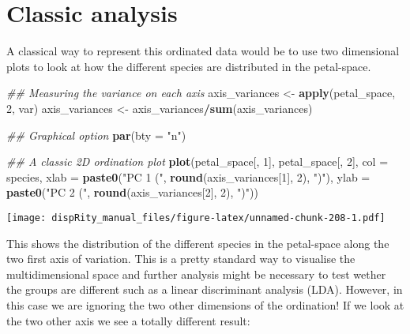 \documentclass[
]{book}
\newenvironment{Shaded}{\begin{snugshade}}{\end{snugshade}}
\newcommand{\CommentTok}[1]{\textcolor[rgb]{0.56,0.35,0.01}{\textit{#1}}}
\newcommand{\DataTypeTok}[1]{\textcolor[rgb]{0.13,0.29,0.53}{#1}}
\newcommand{\DecValTok}[1]{\textcolor[rgb]{0.00,0.00,0.81}{#1}}
\newcommand{\KeywordTok}[1]{\textcolor[rgb]{0.13,0.29,0.53}{\textbf{#1}}}
\newcommand{\NormalTok}[1]{#1}
\newcommand{\OperatorTok}[1]{\textcolor[rgb]{0.81,0.36,0.00}{\textbf{#1}}}
\newcommand{\StringTok}[1]{\textcolor[rgb]{0.31,0.60,0.02}{#1}}
\begin{document}
\hypertarget{classic-analysis}{%
\section{Classic analysis}\label{classic-analysis}}

A classical way to represent this ordinated data would be to use two dimensional plots to look at how the different species are distributed in the petal-space.

\begin{Shaded}
\begin{Highlighting}[]
\CommentTok{\#\# Measuring the variance on each axis}
\NormalTok{axis\_variances \textless{}{-}}\StringTok{ }\KeywordTok{apply}\NormalTok{(petal\_space, }\DecValTok{2}\NormalTok{, var)}
\NormalTok{axis\_variances \textless{}{-}}\StringTok{ }\NormalTok{axis\_variances}\OperatorTok{/}\KeywordTok{sum}\NormalTok{(axis\_variances)}

\CommentTok{\#\# Graphical option}
\KeywordTok{par}\NormalTok{(}\DataTypeTok{bty =} \StringTok{"n"}\NormalTok{)}

\CommentTok{\#\# A classic 2D ordination plot}
\KeywordTok{plot}\NormalTok{(petal\_space[, }\DecValTok{1}\NormalTok{], petal\_space[, }\DecValTok{2}\NormalTok{], }\DataTypeTok{col =}\NormalTok{ species,}
    \DataTypeTok{xlab =} \KeywordTok{paste0}\NormalTok{(}\StringTok{"PC 1 ("}\NormalTok{, }\KeywordTok{round}\NormalTok{(axis\_variances[}\DecValTok{1}\NormalTok{], }\DecValTok{2}\NormalTok{), }\StringTok{")"}\NormalTok{),}
    \DataTypeTok{ylab =} \KeywordTok{paste0}\NormalTok{(}\StringTok{"PC 2 ("}\NormalTok{, }\KeywordTok{round}\NormalTok{(axis\_variances[}\DecValTok{2}\NormalTok{], }\DecValTok{2}\NormalTok{), }\StringTok{")"}\NormalTok{))}
\end{Highlighting}
\end{Shaded}

\texttt{[image: dispRity\_manual\_files/figure-latex/unnamed-chunk-208-1.pdf]}

This shows the distribution of the different species in the petal-space along the two first axis of variation.
This is a pretty standard way to visualise the multidimensional space and further analysis might be necessary to test wether the groups are different such as a linear discriminant analysis (LDA).
However, in this case we are ignoring the two other dimensions of the ordination!
If we look at the two other axis we see a totally different result:
\end{document}
